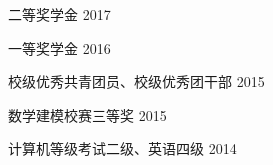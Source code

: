 \vspace{-1.5mm}
\begin{cvhonors}

\cvhonor
{二等奖学金}
{2017}

\cvhonor
{一等奖学金}
{2016}

\cvhonor
{校级优秀共青团员、校级优秀团干部}
{2015}

\cvhonor
{数学建模校赛三等奖}
{2015}

\cvhonor
{计算机等级考试二级、英语四级}
{2014}

\end{cvhonors}